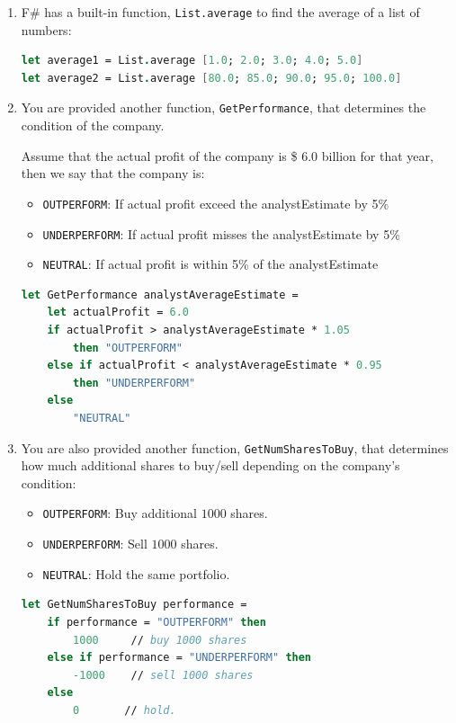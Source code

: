 \documentclass[12pt]{article}
\begin{document}
\begin{enumerate}
\item F\# has a built-in function, \texttt{List.average} to find the average of a list of numbers:
\begin{lstlisting}[language=FSharp]
let average1 = List.average [1.0; 2.0; 3.0; 4.0; 5.0]
let average2 = List.average [80.0; 85.0; 90.0; 95.0; 100.0]
\end{lstlisting}
\item You are provided another function, \texttt{GetPerformance}, that determines the condition of the company.

Assume that the actual profit of the company is \$ 6.0 billion for that year, then we say that the company is:
\begin{itemize}
\item \texttt{OUTPERFORM}: If actual profit exceed the analystEstimate by 5\% 
\item \texttt{UNDERPERFORM}: If actual profit misses the analystEstimate by 5\%
\item \texttt{NEUTRAL}: If actual profit is within 5\% of the analystEstimate
\end{itemize}
\begin{lstlisting}[language=FSharp]
let GetPerformance analystAverageEstimate =
    let actualProfit = 6.0
    if actualProfit > analystAverageEstimate * 1.05
        then "OUTPERFORM"
    else if actualProfit < analystAverageEstimate * 0.95 
        then "UNDERPERFORM"
    else 
        "NEUTRAL"
\end{lstlisting}
\item You are also provided another function, \texttt{GetNumSharesToBuy}, that determines how much additional shares to buy/sell depending on the company's condition:

\begin{itemize}
\item \texttt{OUTPERFORM}: Buy additional $1000$ shares.
\item \texttt{UNDERPERFORM}: Sell $1000$ shares.
\item \texttt{NEUTRAL}: Hold the same portfolio.
\end{itemize}
\begin{lstlisting}[language=FSharp]
let GetNumSharesToBuy performance =
    if performance = "OUTPERFORM" then
        1000     // buy 1000 shares
    else if performance = "UNDERPERFORM" then
        -1000    // sell 1000 shares
    else 
        0       // hold.
\end{lstlisting}
\end{enumerate}
\end{document}
